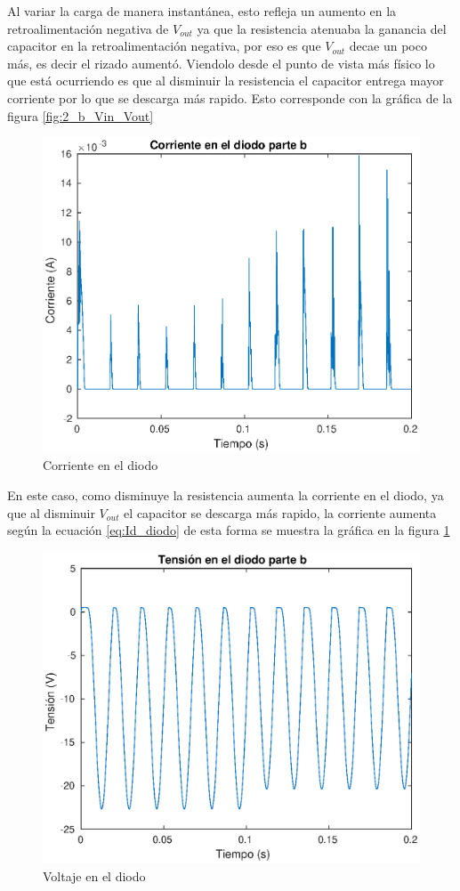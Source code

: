 \documentclass[12pt,letterpaper]{article}
\begin{document}
Al variar la carga de manera instantánea, esto refleja un aumento en la retroalimentación negativa de $V_{out}$ ya que la resistencia atenuaba la ganancia del capacitor en la retroalimentación negativa, por eso es que $V_{out}$ decae un poco más, es decir el rizado aumentó. Viendolo desde el punto de vista más físico lo que está ocurriendo es que al disminuir la resistencia el capacitor entrega mayor corriente por lo que se descarga más rapido. Esto corresponde con la gráfica de la figura \ref{fig:2_b_Vin_Vout}

\begin{figure}[ht!]
  \centering
  \includegraphics[width=0.8\linewidth]{pictures/Ejercicio2_b_corriente_diodo.eps}
  \caption{Corriente en el diodo}
  \label{fig:2_b_Id}
\end{figure}

En este caso, como disminuye la resistencia aumenta la corriente en el diodo, ya que al disminuir $V_{out}$ el capacitor se descarga más rapido, la corriente aumenta según la ecuación \eqref{eq:Id_diodo} de esta forma se muestra la gráfica en la figura \ref{fig:2_b_Id}

\begin{figure}[ht!]
  \centering
  \includegraphics[width=0.8\linewidth]{pictures/Ejercicio2_b_Vd.eps}
  \caption{Voltaje en el diodo}
  \label{fig:2_b_Vd}
\end{figure}
\end{document}
